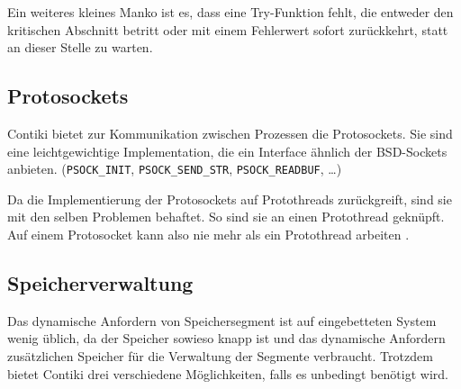 	Ein weiteres kleines Manko ist es, dass eine Try-Funktion fehlt, die
	entweder den kritischen Abschnitt betritt oder mit einem Fehlerwert
	sofort zurückkehrt, statt an dieser Stelle zu warten.


\subsection{Protosockets}
	Contiki bietet zur Kommunikation zwischen Prozessen die Protosockets.
	Sie sind eine leichtgewichtige Implementation, die ein Interface ähnlich
	der BSD-Sockets anbieten.
	(\lstinline=PSOCK_INIT=,
		\lstinline=PSOCK_SEND_STR=,
		\lstinline=PSOCK_READBUF=, \dots)

	Da die Implementierung der Protosockets auf Protothreads zurückgreift,
	sind sie mit den selben Problemen behaftet.  So sind sie \zB an einen
	Protothread geknüpft.  Auf einem Protosocket kann also nie mehr als ein
	Protothread arbeiten
	\parencite[siehe][Protosockets library]{Contiki:Doc}.


\subsection{Speicherverwaltung}
	Das dynamische Anfordern von Speichersegment ist auf eingebetteten
	System wenig üblich, da der Speicher sowieso knapp ist und das
	dynamische Anfordern zusätzlichen Speicher für die Verwaltung der
	Segmente verbraucht.  Trotzdem bietet Contiki drei verschiedene
	Möglichkeiten, falls es unbedingt benötigt wird.

